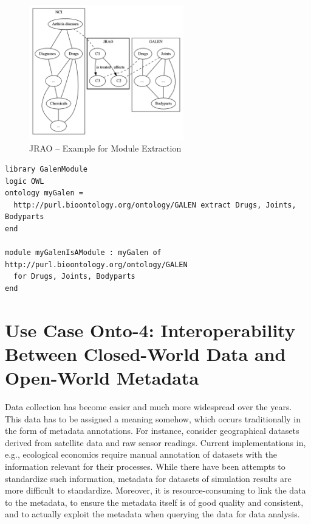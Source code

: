 \documentclass[10pt,fleqn,final]{scrreprt}
\newenvironment{definitions}[0]{\medskip }{}
\begin{document}
\begin{definitions}
\begin{figure}[htbp]
\begin{center}
\includegraphics[width=0.6\textwidth]{useCaseOnto3.png}
\caption{JRAO  -- Example for Module Extraction}
\label{JRAO}
\end{center}
\end{figure}


\begin{lstlisting}[basicstyle=\ttfamily,language=dolText,morekeywords={props,ObjectProperty,Class,DisjointUnionOf,SubClassOf,Characteristics,Transitive,Asymmetric,SubPropertyOf,DisjointClasses,EquivalentTo,inverse,only,forall,iff,if,or,exists,distributed,extract},escapechar=@,mathescape]
library GalenModule
logic OWL
ontology myGalen = 
  http://purl.bioontology.org/ontology/GALEN extract Drugs, Joints, Bodyparts
end

module myGalenIsAModule : myGalen of http://purl.bioontology.org/ontology/GALEN 
  for Drugs, Joints, Bodyparts
end
\end{lstlisting}
 


\section{Use Case Onto-4: Interoperability Between Closed-World Data and Open-World Metadata}
Data collection has become easier and much more widespread over the years. This data has to be 
assigned a meaning somehow, which occurs traditionally in the  form of metadata annotations. For 
instance, consider geographical datasets derived from satellite data and raw sensor readings. 
Current implementations in, e.g., ecological economics\cite{bagstad_aries_2011} require manual 
annotation of datasets with the information relevant for their processes. While there have been 
attempts to standardize such information\cite{european_comission_inspire_2014}, metadata for 
datasets of simulation results are more difficult to standardize. Moreover, it is 
resource-consuming to link the data to the metadata, to ensure the metadata itself is of good 
quality and consistent, and to actually exploit the metadata when querying the data for data 
analysis. 


\end{definitions}
\end{document}
